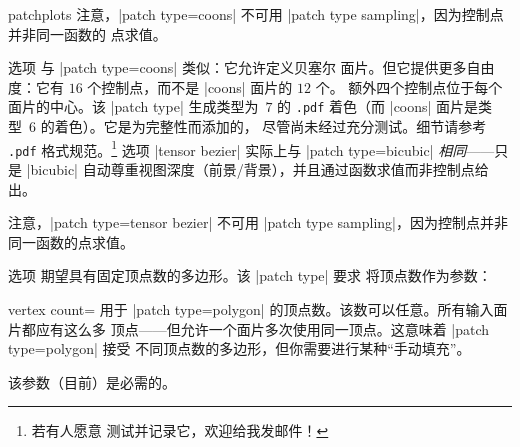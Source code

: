 {\begin{pgfplotslibrary}{patchplots}
注意，|patch type=coons| 不可用 |patch type sampling|，因为控制点并非同一函数的
点求值。

选项  与 |patch type=coons| 类似：它允许定义贝塞尔
面片。但它提供更多自由度：它有 $16$ 个控制点，而不是 |coons| 面片的 $12$ 个。
额外四个控制点位于每个面片的中心。该 |patch type| 生成类型为~$7$ 的
\texttt{.pdf} 着色（而 |coons| 面片是类型~$6$ 的着色）。它是为完整性而添加的，
尽管尚未经过充分测试。细节请参考 \texttt{.pdf} 格式规范。\footnote{若有人愿意
测试并记录它，欢迎给我发邮件！}
选项 |tensor bezier| 实际上与 |patch type=bicubic| \emph{相同}——只是
|bicubic| 自动尊重视图深度（前景/背景），并且通过函数求值而非控制点给出。

注意，|patch type=tensor bezier| 不可用 |patch type sampling|，因为控制点并非
同一函数的点求值。

选项  期望具有固定顶点数的多边形。该 |patch type| 要求
将顶点数作为参数：

\begin{pgfplotskey}{vertex count=}
    用于 |patch type=polygon| 的顶点数。该数可以任意。所有输入面片都应有这么多
    顶点——但允许一个面片多次使用同一顶点。这意味着 |patch type=polygon| 接受
    不同顶点数的多边形，但你需要进行某种“手动填充”。

    该参数（目前）是必需的。
\end{pgfplotskey}


\end{pgfplotslibrary}}

